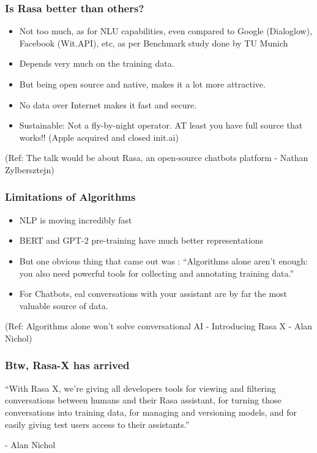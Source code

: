 \begin{frame}[fragile]\frametitle{Is Rasa better than others?}
\begin{itemize}
\item Not too much, as for NLU capabilities, even compared to Google (Dialoglow), Facebook (Wit.API), etc, as per Benchmark study done by TU Munich
\item Depends very much on the training data.
\item But being open source and native, makes it a lot more attractive.
\item No data over Internet makes it fast and secure.
\item Sustainable: Not a fly-by-night operator. AT least you have full source that works!! (Apple acquired and closed init.ai)
\end{itemize}

{\tiny (Ref: The talk would be about Rasa, an open-source chatbots platform - Nathan Zylbersztejn)}

\end{frame}

 \begin{frame}[fragile]\frametitle{Limitations of Algorithms}
\begin{itemize}
\item NLP is moving incredibly fast
\item BERT and GPT-2 pre-training have much better representations
\item But one obvious thing that came out was : ``Algorithms alone aren't enough: you also need powerful tools for collecting and annotating training data.''
\item For Chatbots, eal conversations with your assistant are by far the most valuable source of data.
\end{itemize}
{\tiny (Ref: Algorithms alone won’t solve conversational AI - Introducing Rasa X - Alan Nichol)}

\end{frame}

 \begin{frame}[fragile]\frametitle{Btw, Rasa-X has arrived}
``With Rasa X, we’re giving all developers tools for viewing and filtering conversations between humans and their Rasa assistant, for turning those conversations into training data, for managing and versioning models, and for easily giving test users access to their assistants.''

- Alan Nichol
\end{frame}

